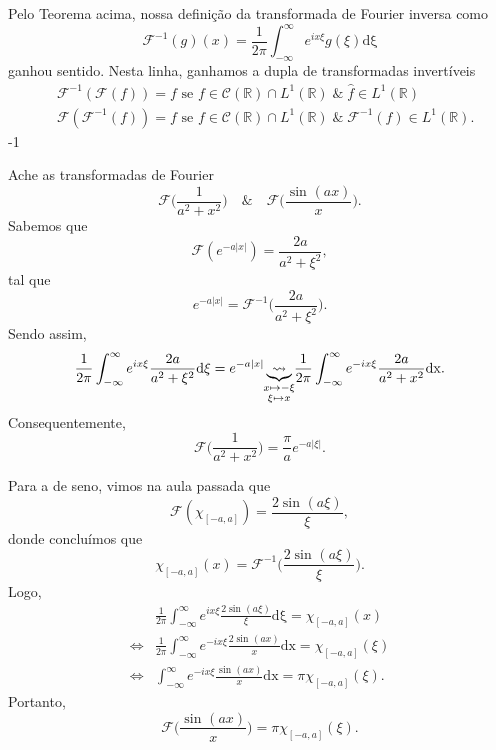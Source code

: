 \documentclass[../pde_notes.tex]{subfiles}
\begin{document}
Pelo Teorema acima, nossa definição da transformada de Fourier inversa como
\[
	\mathcal{F}^{-1}(g)(x) = \frac{1}{2\pi }\int_{-\infty}^{\infty}e^{ix\xi }g(\xi ) \mathrm{d\xi }
\]
ganhou sentido. Nesta linha, ganhamos a dupla de transformadas invertíveis
\begin{align*}
	 & \mathcal{F}^{-1}(\mathcal{F}(f)) = f \text{ se }f\in \mathcal{C}(\mathbb{R})\cap L^{1}(\mathbb{R})\;\&\;\hat{f}\in L^{1}(\mathbb{R})               \\
	 & \mathcal{F}(\mathcal{F}^{-1}(f)) = f \text{ se }f\in \mathcal{C}(\mathbb{R})\cap L^{1}(\mathbb{R})\;\&\; \mathcal{F}^{-1}(f)\in L^{1}(\mathbb{R}).
\end{align*}-1
\begin{example}
	Ache as transformadas de Fourier
	\[
		\mathcal{F}\biggl(\frac{1}{a^{2}+x^{2}}\biggr)\quad\&\quad \mathcal{F}\biggl(\frac{\sin^{}{(ax)}}{x}\biggr).
	\]
	Sabemos que
	\[
		\mathcal{F}(e^{-a|x|}) = \frac{2a}{a^{2}+\xi^{2}},
	\]
	tal que
	\[
		e^{-a|x|} = \mathcal{F}^{-1}\biggl(\frac{2a}{a^{2}+\xi ^{2}}\biggr).
	\]
	Sendo assim,
	\[
		\frac{1}{2\pi }\int_{-\infty}^{\infty}e^{ix\xi }\frac{2a}{a^{2}+\xi^{2}} \mathrm{d\xi } = e^{-a|x|}\underbrace{\rightsquigarrow}_{\mathclap{\substack{x\mapsto -\xi  \\ \xi \mapsto x}}} \frac{1}{2\pi }\int_{-\infty}^{\infty}e^{-ix\xi }\frac{2a}{a^{2}+x^{2}} \mathrm{dx}.
	\]
	Consequentemente,
	\[
		\mathcal{F}\biggl(\frac{1}{a^{2}+x^{2}}\biggr) = \frac{\pi }{a}e^{-a|\xi |}.
	\]

	Para a de seno, vimos na aula passada que
	\[
		\mathcal{F}(\chi_{[-a, a]}) = \frac{2\sin^{}{(a\xi )}}{\xi },
	\]
	donde concluímos que
	\[
		\chi_{[-a, a]}(x) = \mathcal{F}^{-1}\biggl(\frac{2\sin^{}{(a\xi )}}{\xi }\biggr).
	\]
	Logo,
	\begin{align*}
		                    & \frac{1}{2\pi }\int_{-\infty}^{\infty}e^{ix\xi }\frac{2\sin^{}{(a\xi )}}{\xi } \mathrm{d\xi } = \chi_{[-a, a]}(x) \\
		\Longleftrightarrow & \frac{1}{2\pi }\int_{-\infty}^{\infty}e^{-ix\xi }\frac{2\sin^{}{(ax)}}{x} \mathrm{dx} =\chi_{[-a, a]}(\xi )       \\
		\Longleftrightarrow & \int_{-\infty}^{\infty}e^{-ix\xi }\frac{\sin^{}{(ax)}}{x} \mathrm{dx} = \pi \chi_{[-a, a]}(\xi ).
	\end{align*}
	Portanto,
	\[
		\mathcal{F}\biggl(\frac{\sin^{}{(ax)}}{x}\biggr) = \pi \chi_{[-a, a]}(\xi ).
	\]

\end{example}
\end{document}
